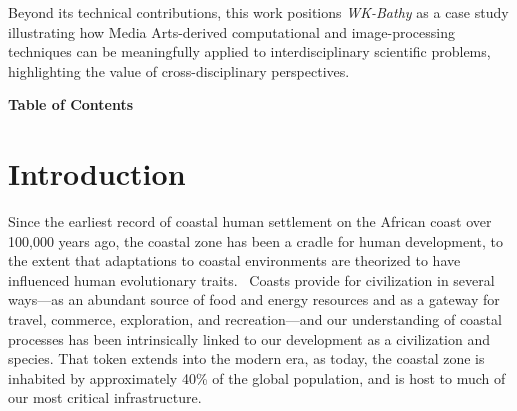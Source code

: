 \documentclass[12pt]{article}
\renewcommand{\headrulewidth}{0pt}
\begin{document}
Beyond its technical contributions, this work positions \textit{WK-Bathy} as a case study illustrating how Media Arts-derived computational and image-processing techniques can be meaningfully applied to interdisciplinary scientific problems, highlighting the value of cross-disciplinary perspectives.

\newpage
\thispagestyle{empty}
\begin{center}
{\Large\bfseries Table of Contents}
\end{center}
\vspace{0.5cm}
\tableofcontents
\newpage

\setcounter{page}{1}
\fancyhead[R]{\footnotesize\itshape\thepage}
\renewcommand{\headrulewidth}{0.4pt}
\setlength{\headheight}{14pt}

\section{Introduction}

Since the earliest record of coastal human settlement on the African coast over 100,000 years ago, the coastal zone has been a cradle for human development, to the extent that adaptations to coastal environments are theorized to have influenced human evolutionary traits.~\cite{Will2016} Coasts provide for civilization in several ways---as an abundant source of food and energy resources and as a gateway for travel, commerce, exploration, and recreation---and our understanding of coastal processes has been intrinsically linked to our development as a civilization and species. That token extends into the modern era, as today, the coastal zone is inhabited by approximately 40\% of the global population, and is host to much of our most critical infrastructure.~\cite{Reithmeier2025}
\end{document}
